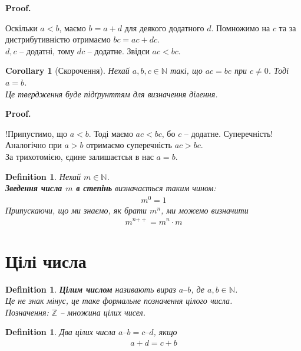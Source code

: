 \documentclass[a4paper, 14pt]{extarticle}
\makeatletter
\theoremstyle{theoremdd}
\theoremstyle{theoremdd}
\newtheorem{definition}[theorem]{Definition}
\theoremstyle{theoremdd}
\theoremstyle{theoremdd}
\theoremstyle{theoremdd}
\theoremstyle{theoremdd}
\theoremstyle{theoremdd}
\theoremstyle{theoremdd}
\theoremstyle{theoremdd}
\theoremstyle{theoremdd}
\theoremstyle{theoremdd}
\theoremstyle{theoremdd}
\theoremstyle{theoremdd}
\theoremstyle{theoremdd}
\theoremstyle{theoremdd}
\newtheorem{corollary}[theorem]{Corollary}
\theoremstyle{theoremdd}
\renewenvironment{proof}[1][Proof.\\]{\par
\pushQED{\hfill \qed}%
\normalfont \topsep6\p@\@plus6\p@\relax
\trivlist
\item\relax
{\bfseries
#1\@addpunct{.}}\hspace\labelsep\ignorespaces
}{%
\popQED\endtrivlist\@endpefalse
}
\newcommand{\plusplus}{\!\!\mathrel{++}}
\newcommand{\subtract}{\text{--}}
\makeatother
\begin{document}
\begin{proof}
Оскільки $a < b$, маємо $b = a+d$ для деякого додатного $d$. Помножимо на $c$ та за дистрибутивністю отримаємо $bc = ac + dc$.\\
$d,c$ -- додатні, тому $dc$ -- додатне. Звідси $ac < bc$.
\end{proof}

\begin{corollary}[Скорочення]
Нехай $a,b,c \in \mathbb{N}$ такі, що $ac = bc$ при $c \neq 0$. Тоді $a = b$.\\
\textit{Це твердження буде підґрунттям для визначення ділення.}
\end{corollary}

\begin{proof}
!Припустимо, що $a < b$. Тоді маємо $ac < bc$, бо $c$ -- додатне. Суперечність!\\
Аналогічно при $a > b$ отримаємо суперечність $ac > bc$.\\
За трихотомією, єдине залишаєтсья в нас $a = b$.
\end{proof}

\begin{definition}
Нехай $m \in \mathbb{N}$.\\
\textbf{Зведення числа $m$ в степінь} визначається таким чином:
\begin{align*}
m^0 = 1
\end{align*}
Припускаючи, що ми знаємо, як брати $m^n$, ми можемо визначити
\begin{align*}
m^{n\plusplus} = m^n \cdot m
\end{align*}
\end{definition}
\newpage

\section{Цілі числа}
\begin{definition}
\textbf{Цілим числом} називають вираз $a\subtract b$, де $a,b \in \mathbb{N}$.\\
\textit{Це не знак мінус, це таке формальне позначення цілого числа.}
\bigskip \\
Позначення: $\mathbb{Z}$ -- множина цілих чисел.
\end{definition}

\begin{definition}
Два цілих числа $a \subtract b =  c \subtract d$, якщо
\begin{align*}
a + d = c + b
\end{align*}
\end{definition}
\end{document}
